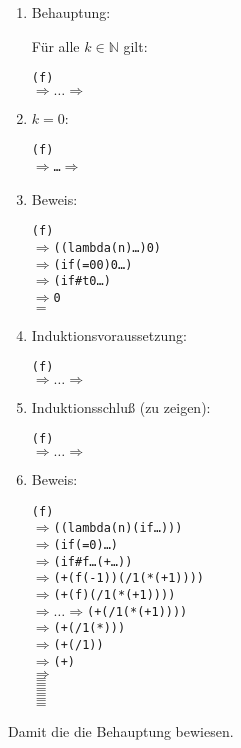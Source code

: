 \begin{enumerate}
\item Behauptung:

  Für alle $k\in\mathbb{N}$ gilt:

\begin{alltt}
(f )
\(\Longrightarrow\ldots\Longrightarrow\) 
\end{alltt}

\item $k=0$:
%
\begin{alltt}
(f )
\(\Longrightarrow\)\ldots\(\Longrightarrow\) 
\end{alltt}

\item Beweis:
\begin{alltt}
(f )
\(\Longrightarrow\) ((lambda (n) \ldots) 0)
\(\Longrightarrow\) (if (= 0 0) 0 \ldots)
\(\Longrightarrow\) (if #t 0 \ldots)
\(\Longrightarrow\) 0
\(=\) 
\end{alltt}
%
\item Induktionsvoraussetzung:

\begin{alltt}
(f )
\(\Longrightarrow\ldots\Longrightarrow\) 
\end{alltt}

\item
Induktionsschluß (zu zeigen):
%
\begin{alltt}
(f )
\(\Longrightarrow\ldots\Longrightarrow\) 
\end{alltt}
%
\item Beweis:
\begin{alltt}
(f )
\(\Longrightarrow\) ((lambda (n) (if \ldots)) )
\(\Longrightarrow\) (if (=  0) \ldots)
\(\Longrightarrow\) (if #f \ldots (+ \ldots))
\(\Longrightarrow\) (+ (f (-  1)) (/ 1 (*  (+  1))))
\(\Longrightarrow\) (+ (f ) (/ 1 (*  (+  1))))
\(\Longrightarrow\ldots\Longrightarrow\) (+  (/ 1 (*  (+  1))))
\(\Longrightarrow\) (+  (/ 1 (*  )))
\(\Longrightarrow\) (+  (/ 1 ))
\(\Longrightarrow\) (+  )
\(\Longrightarrow\) 
\(=\) 
\(=\) 
\(=\) 
\(=\) 
\(=\) 
\(=\) 
\end{alltt}
%
\end{enumerate}
Damit die die Behauptung bewiesen.

